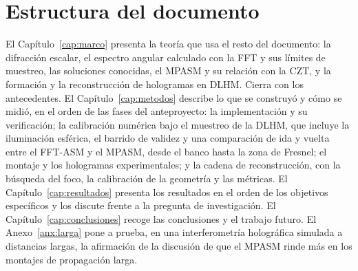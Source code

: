 \section{Estructura del documento}

El Capítulo~\ref{cap:marco} presenta la teoría que usa el resto del documento:
la difracción escalar, el espectro angular calculado con la FFT y sus límites
de muestreo, las soluciones conocidas, el MPASM y su relación con la CZT, y la
formación y la reconstrucción de hologramas en DLHM. Cierra con los
antecedentes. El Capítulo~\ref{cap:metodos} describe lo que se construyó y cómo
se midió, en el orden de las fases del anteproyecto: la implementación y su
verificación; la calibración numérica bajo el muestreo de la DLHM, que incluye
la iluminación esférica, el barrido de validez y una comparación de ida y
vuelta entre el FFT-ASM y el MPASM, desde el banco hasta la zona de Fresnel;
el montaje y los hologramas experimentales; y la cadena de reconstrucción,
con la búsqueda del foco, la calibración de la geometría y las métricas. El Capítulo~\ref{cap:resultados} presenta los
resultados en el orden de los objetivos específicos y los discute frente a la
pregunta de investigación. El Capítulo~\ref{cap:conclusiones} recoge las
conclusiones y el trabajo futuro. El Anexo~\ref{anx:larga} pone a prueba, en
una interferometría holográfica simulada a distancias largas, la afirmación de
la discusión de que el MPASM rinde más en los montajes de propagación larga.
